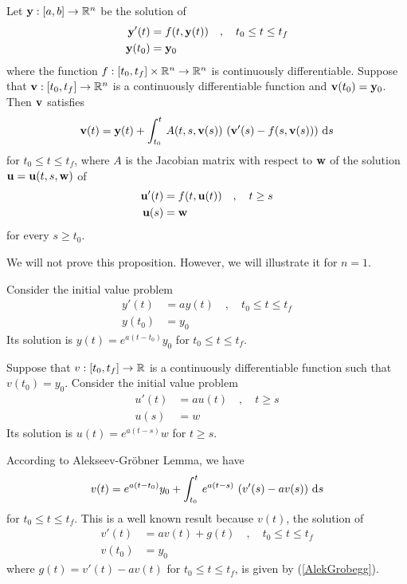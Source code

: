 \begin{prop}
Let $\mathbf{y}:[a,b] \rightarrow \mathbb{R}^n$ be the solution of
\begin{align*}
\mathbf{y}'(t) &= f(t,\mathbf{y}(t)) \quad, \quad t_0 \leq t \leq t_f \\
\mathbf{y}(t_0) & = \mathbf{y}_0
\end{align*}
where the function $f:[t_0,t_f]\times \mathbb{R}^n \to \mathbb{R}^n$ is continuously
differentiable.  Suppose that $\mathbf{v}:[t_0,t_f]\rightarrow \mathbb{R}^n$ is
a continuously differentiable function and $\mathbf{v}(t_0) = \mathbf{y}_0$.
Then $\mathbf{v}$ satisfies
\[
\mathbf{v}(t) = \mathbf{y}(t) + \int_{t_0}^t\,A(t,s,\mathbf{v}(s))\,
\left( \mathbf{v}'(s) - f(s,\mathbf{v}(s)) \right) \,\mathrm{d}s
\]
for $t_0 \leq t \leq t_f$, where $A$ is the Jacobian matrix
with respect to $\mathbf{w}$ of the solution
$\mathbf{u} = \mathbf{u}(t,s,\mathbf{w})$ of
\begin{align*}
\mathbf{u}'(t) &= f(t,\mathbf{u}(t)) \quad , \quad t \geq s \\
\mathbf{u}(s) &= \mathbf{w}
\end{align*}
for every $s \geq t_0$.
\end{prop}

We will not prove this proposition.  However, we will illustrate it
for $n=1$.

\begin{egg}
Consider the initial value problem
\begin{align*}
y'(t) &= a y(t) \quad , \quad t_0 \leq t \leq t_f\\
y(t_0) &= y_0
\end{align*}
Its solution is $y(t) = e^{a(t-t_0)}y_0$ for $t_0 \leq t \leq t_f$.

Suppose that $v:[t_0,t_f]\rightarrow \mathbb{R}$ is a continuously
differentiable function such that $v(t_0) = y_0$.  Consider the
initial value problem
\begin{align*}
u'(t) &= a u(t) \quad , \quad t \geq s\\
u(s) &= w
\end{align*}
Its solution is $u(t) = e^{a(t-s)}w$ for $t \geq s$.

According to Alekseev-Gr\"{o}bner Lemma, we have
\begin{equation}\label{AlekGrobegg}
v(t) = e^{a(t-t_0)}y_0 + \int_{t_0}^t\,e^{a(t-s)}\,
\left(v'(s) - a v(s)\right) \,\mathrm{d}s
\end{equation}
for $t_0 \leq t \leq t_f$.  This is a well known result because $v(t)$,
the solution of
\begin{align*}
v'(t) & = a v(t) + g(t) \quad , \quad t_0 \leq t \leq t_f \\
v(t_0) &= y_0
\end{align*}
where $g(t) = v'(t) - av(t)$ for $t_0 \leq t \leq t_f$, is given by
(\ref{AlekGrobegg}).
\end{egg}


